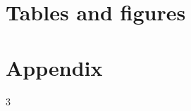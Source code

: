 \documentclass[a4paper, 12pt, onecolumn]{article}
\begin{document}
\clearpage
\newpage
\section*{Tables and figures}










\clearpage
\newpage
\section*{Appendix}




\clearpage
\newpage
\begin{singlespacing}
\setcounter{tocdepth}3
\tableofcontents
\end{singlespacing}
\end{document}
